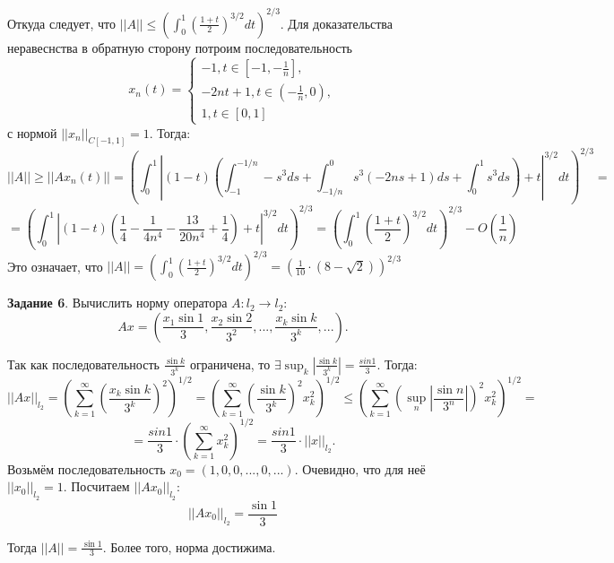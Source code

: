 \documentclass[fleqn]{article}
\begin{document}
Откуда следует, что $||A|| \leq \left(\int_0^1 \left(\frac{1 + t}2\right)^{3/2} dt\right)^{2/3}$. 
Для доказательства неравеснства в обратную сторону потроим
последовательность
\begin{equation*} 
	x_n(t) = 	\begin{cases}
			-1, t \in [-1,-\frac1n], \\
			-2nt + 1, t \in (-\frac1n, 0), \\
			1, t \in [0, 1]
		\end{cases}
\end{equation*}
с нормой $||x_n||_{C[-1,1]} = 1$. Тогда:
\begin{equation*} 
	||A|| \geq ||Ax_n(t)|| = 
	\left(\int_0^1 \left|(1 - t)\left(\int_{-1}^{-1/n} -s^3ds + \int_{-1/n}^{0} s^3(-2ns + 1)ds + \int_{0}^1 s^3ds\right) + t\right|^{3/2} dt\right)^{2/3} =
\end{equation*}
\begin{equation*} 
	 = \left(\int_0^1 \left|(1 - t)\left(\frac14 - \frac1{4n^4} - \frac{13}{20 n^4} + \frac14\right) + t\right|^{3/2} dt\right)^{2/3} = \left(\int_0^1 \left(\frac{1 + t}2\right)^{3/2} dt\right)^{2/3} - O\left(\frac1n\right)
\end{equation*}
	Это означает, что $||A|| = \left(\int_0^1 \left(\frac{1 + t}2\right)^{3/2} dt\right)^{2/3} = \left(\frac1{10}\cdot{}(8 - \sqrt{2})\right)^{2/3}$
	
	\textbf {Задание 6}. Вычислить норму оператора $A: l_2\xrightarrow{}l_2$:
\begin{equation*} 
	Ax = \left(\frac{x_1\sin1}{3},\frac{x_2\sin2}{3^2}, ..., \frac{x_k\sin{k}}{3^k}, ... \right).
\end{equation*}

	Так как последовательность $\frac{\sin{k}}{3^k}$ ограничена, то  $\exists\sup_k{\left|\frac{\sin{k}}{3^k}\right|} = \frac{sin 1}{3}$. Тогда:
	\begin{equation*} 
	||Ax||_{l_2} = \left(\sum_{k=1}^{\infty}\left(\frac{x_k\sin{k}}{3^k}\right)^2\right)^{1/2} =
	\left(\sum_{k=1}^{\infty}\left(\frac{\sin{k}}{3^k}\right)^2x_k^2\right)^{1/2} \leq
	\left(\sum_{k=1}^{\infty}\left(\sup_n{\left|\frac{\sin{n}}{3^n}\right|}\right)^2x_k^2\right)^{1/2} = 
\end{equation*}
\begin{equation*} 
	= \frac{sin 1}{3} \cdot{\left(\sum_{k=1}^{\infty}x_k^2\right)^{1/2} } = \frac{sin 1}{3} \cdot{||x||_{l_2}}.
\end{equation*}
	Возьмём последовательность $x_0 = (1, 0, 0, ..., 0, ...)$. Очевидно, что для неё 
	$||x_0||_{l_2} = 1$. Посчитаем $||Ax_0||_{l_2}$:
	\begin{equation*} 
	||Ax_0||_{l_2} = \frac{\sin{1}}{3}
\end{equation*}

Тогда $||A|| = \frac{\sin{1}}{3}$. Более того, норма достижима.
\end{document}
